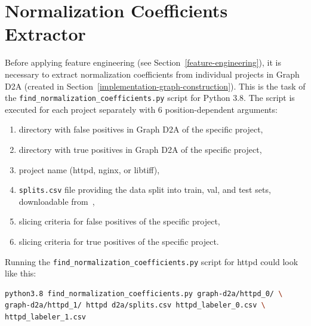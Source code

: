 \section{Normalization Coefficients Extractor}
\label{implementation-norm-coeffs}
Before applying feature engineering (see Section~\ref{feature-engineering}), it is necessary to extract normalization coefficients from individual projects in Graph D2A (created in Section~\ref{implementation-graph-construction}). This is the task of the \texttt{find\_normalization\_coefficients.py} script for Python 3.8. The script is executed for each project separately with 6 position-dependent arguments:
\begin{enumerate}
    \item directory with false positives in Graph D2A of the specific project,
    \item directory with true positives in Graph D2A of the specific project,
    \item project name (httpd, nginx, or libtiff),
    \item \texttt{splits.csv} file providing the data split into train, val, and test sets, downloadable from~\cite{D2A-webpage},
    \item slicing criteria for false positives of the specific project,
    \item slicing criteria for true positives of the specific project.
\end{enumerate}
Running the \texttt{find\_normalization\_coefficients.py} script for httpd could look like this:
\begin{lstlisting}[language=bash, xleftmargin=2em]
python3.8 find_normalization_coefficients.py graph-d2a/httpd_0/ \
graph-d2a/httpd_1/ httpd d2a/splits.csv httpd_labeler_0.csv \
httpd_labeler_1.csv
\end{lstlisting}

